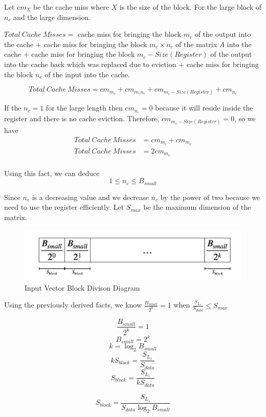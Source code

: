 Let $cm_X$ be the cache miss where $X$ is the size of the block.
For the large block of $n_c$ and the large dimension.

$Total\ Cache\ Misses = $ cache miss for bringing the block $m_c$ of the output into the cache $+$
cache miss for bringing the block $m_c \times n_c$ of the matrix $A$ into the cache $+$
cache miss for bringing the block $m_c - Size(Register)$ of the output into the cache back which was
replaced due to eviction + cache miss for bringing the block $n_c$ of the input into the cache.

\[Total\ Cache\ Misses = cm_{m_c} + cm_{m_cn_c} + cm_{m_c - Size(Register)} + cm_{n_c}\]

If the $n_c = 1$ for the large length then $cm_{n_c} = 0$ because it will reside inside the register 
and there is no cache eviction. Therefore, $cm_{m_c - Size(Register)} = 0$, so we have
\begin{align*}
    Total\ Cache\ Misses &= cm_{m_c} + cm_{m_c}\\
    Total\ Cache\ Misses &= 2cm_{m_c}\\
\end{align*}

Using this fact, we can deduce
\[1 \leq n_c \leq B_{small}\]

Since $n_c$ is a decreasing value and we decrease $n_c$ by the power of two 
because we need to use the register efficiently. Let $S_{max}$ be the maximum dimension 
of the matrix.

\begin{figure}[htb]
    \centering
    \caption{Input Vector Block Divison Diagram}
    \includegraphics[width=15cm]{../assets/mtv/col_major/input_block_diagram.png} %
\end{figure}

Using the previously derived facts, we know $\frac{B_{small}}{2^k} = 1$ 
when $\frac{S_{L_1}}{S_{data}} \leq S_{max}$

\[\frac{B_{small}}{2^k} = 1\]
\[B_{small} = 2^k\]
\[k = \log_2{B_{small}}\]
\[kS_{block} = \frac{S_{L_1}}{S_{data}}\]
\[S_{block} = \frac{S_{L_1}}{kS_{data}}\]

\begin{equation}
    S_{block} = \frac{S_{L_1}}{S_{data} \log_2{B_{small}}}
\end{equation}

